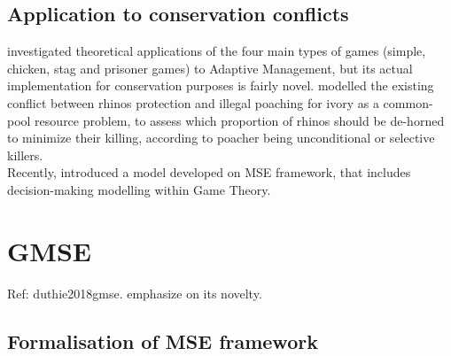 \documentclass[12pt,a4paper]{article}
\begin{document}
\subsection{Application to conservation conflicts}
\cite{COLYVAN20111246} investigated theoretical applications of the four main types of games (simple, chicken, stag and prisoner games) to Adaptive Management, but its actual implementation for conservation purposes is fairly novel. 
\cite{glynatsi2018evolutionary} modelled the existing conflict between rhinos protection and illegal poaching for ivory as a common-pool resource problem, to assess which proportion of rhinos should be de-horned to minimize their killing, according to poacher being unconditional or selective killers.\\ %
Recently, \cite{duthie2018} introduced  a model developed on MSE framework, that includes decision-making modelling within Game Theory.

\section{GMSE} Ref: duthie2018gmse. emphasize on its novelty.

\subsection{Formalisation of MSE framework}
\end{document}
